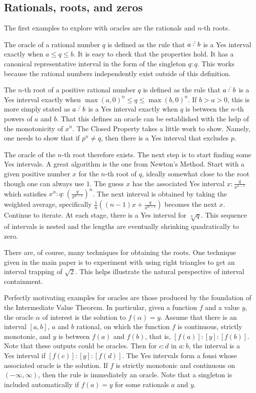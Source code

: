 \documentclass[12pt]{article}
\begin{document}
\subsection{Rationals, roots, and zeros}

The first examples to explore with oracles are the rationals and $n$-th roots. 

The oracle of a rational number $q$ is defined as the rule that $a\lte b$ is a Yes interval exactly when $a \leq q \leq b$. It is easy to check that the properties hold. It has a canonical representative interval in the form of the singleton $q:q$. This works because the rational numbers independently exist outside of this definition. 

The $n$-th root of a positive rational number $q$ is defined as the rule that $a\lte b$ is a Yes interval exactly when $\max(a, 0)^n \leq q \leq \max(b,0)^n$. If $b > a> 0$, this is more simply stated as $a\lte b$ is a Yes interval exactly when $q$ is between the $n$-th powers of $a$ and $b$. That this defines an oracle can be established with the help of the monotonicity of $x^n$. The Closed Property takes a little work to show. Namely, one needs to show that if $p^n \neq q$, then there is a Yes interval that excludes $p$. 

The oracle of the $n$-th root therefore exists. The next step is to start finding some Yes intervals. A great algorithm is the one from Newton's Method. Start with a given positive number $x$ for the $n$-th root of $q$, ideally somewhat close to the root though one can always use $1$. The guess $x$ has the associated Yes interval $x:\frac{q}{x^{n-1}}$ which satisfies $x^n : q : (\frac{q}{x^{n-1}})^n$. The next interval is obtained by taking the weighted average, specifically $\frac{1}{n}( (n-1) x + \frac{q}{x^{n-1}} )$ becomes the next $x$. Continue to iterate. At each stage, there is a Yes interval for $\sqrt[n]{q}$. This sequence of intervals is nested and the lengths are eventually shrinking quadratically to zero.  

There are, of course, many techniques for obtaining the roots. One technique given in the main paper is to experiment with using right triangles to get an interval trapping of $\sqrt{2}$. This helps illustrate the natural perspective of interval containment.  

Perfectly motivating examples for oracles are those produced by the foundation of the Intermediate Value Theorem. In particular, given a function $f$ and a value $y$, the oracle $\alpha$ of interest is the solution to $f(\alpha) = y$. Assume that there is an interval $[a,b]$, $a$ and $b$ rational,  on which the function $f$ is continuous, strictly monotonic, and $y$ is between $f(a)$ and $f(b)$, that is, $[f(a)] : [y] : [f(b)]$. Note that these outputs could be oracles. Then for $c:d$ in $a:b$, the interval is a Yes interval if $[f(c)]: [y] : [f(d)]$. The Yes intervals form a fonsi whose associated oracle is the solution.  If $f$ is strictly monotonic and continuous on $(-\infty, \infty)$, then the rule is immediately an oracle. Note that a singleton is included automatically if $f(a) =y $ for some rationals $a$ and $y$.
\end{document}

